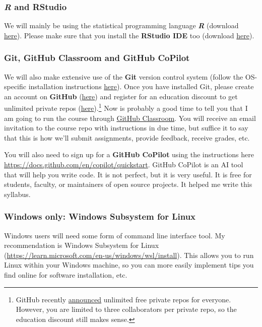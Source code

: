 \documentclass[11pt]{article}
\begin{document}
\vspace{-0.25cm}
\subsubsection*{\textit{R} and RStudio}

We will mainly be using the statistical programming language \textbf{\textit{R}} (download \href{https://www.r-project.org/}{here}). 
Please make sure that you install the \textbf{RStudio IDE} too (download \href{https://www.rstudio.com/products/rstudio/download/preview/}{here}).

\vspace{-0.25cm}
\subsubsection*{Git, GitHub Classroom and GitHub CoPilot}

We will also make extensive use of the \textbf{Git} version control system (follow the OS-specific installation instructions \href{http://happygitwithr.com/install-git.html}{here}). Once you have installed Git, please create an account on \textbf{GitHub} (\href{https://github.com/join}{here}) and register for an education discount to get unlimited private repos (\href{https://education.github.com/discount_requests/new}{here}).\footnote{GitHub recently \href{https://blog.github.com/changelog/2019-01-08-pricing-changes/}{announced} unlimited free private repos for everyone. However, you are limited to three collaborators per private repo, so the education discount still makes sense.} Now is probably a good time to tell you that I am going to run the course through \href{https://classroom.github.com/}{GitHub Classroom}. You will receive an email invitation to the course repo with instructions in due time, but suffice it to say that this is how we'll submit assignments, provide feedback, receive grades, etc.

You will also need to sign up for a \textbf{GitHub CoPilot} using the instructions here \url{https://docs.github.com/en/copilot/quickstart}. GitHub CoPilot is an AI tool that will help you write code. It is not perfect, but it is very useful. It is free for students, faculty, or maintainers of open source projects. It helped me write this syllabus. 

\vspace{-0.25cm}
\subsubsection*{Windows only: Windows Subsystem for Linux}
Windows users will need some form of command line interface tool. My recommendation is Windows Subsystem for Linux (\url{https://learn.microsoft.com/en-us/windows/wsl/install}). This allows you to run Linux within your Windows machine, so you can more easily implement tips you find online for software installation, etc. 
\end{document}
